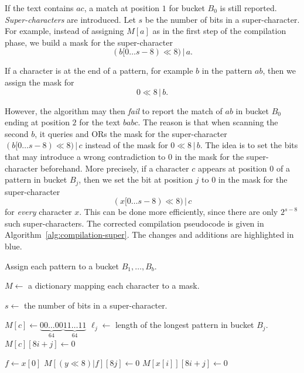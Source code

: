 If the text contains $ac$, a match at position $1$ for bucket $B_0$ is still reported. \textit{Super-characters} are introduced. Let $s$ be the number of bits in a super-character. For example, instead of assigning $M[a]$ as in the first step of the compilation phase, we build a mask for the super-character
$$(b[0\ldots s-8)\ll 8) \,|\, a.$$

If a character is at the end of a pattern, for example $b$ in the pattern $ab$, then we assign the mask for
$$0\ll 8 \,|\, b.$$

However, the algorithm may then \textit{fail} to report the match of $ab$ in bucket $B_0$ ending at position $2$ for the text $babc$. The reason is that when scanning the second $b$, it queries and ORs the mask for the super-character $(b[0\ldots s-8)\ll 8) \,|\, c$ instead of the mask for $0\ll 8 \,|\, b$. The idea is to set the bits that may introduce a wrong contradiction to $0$ in the mask for the super-character beforehand. More precisely, if a character $c$ appears at position $0$ of a pattern in bucket $B_j$, then we set the bit at position $j$ to $0$ in the mask for the super-character
$$(x[0\ldots s-8)\ll 8) \,|\, c$$
for \textit{every} character $x$. This can be done more efficiently, since there are only $2^{s-8}$ such super-characters. The corrected compilation pseudocode is given in Algorithm~\ref{alg:compilation-super}. The changes and additions are highlighted in \textcolor{gustave}{blue}.

\begin{algorithm}[H]
  \caption{Compilation phase: building masks with super-characters}
  \label{alg:compilation-super}
  \begin{algorithmic}[1]
    \State Assign each pattern to a bucket $B_1,\ldots,B_b$.

    \State $M\gets$  a dictionary mapping each character to a mask.

    \State \textcolor{gustave}{$s\gets$ the number of bits in a super-character.}

    \State $M[c] \gets \underbrace{00\ldots00}_{64}\underbrace{11\ldots11}_{64}$ 
    \State $\ell_j\gets$ length of the longest pattern in bucket $B_j$.
    \State $M[c][8i+j] \gets 0$ 
    \EndFor
    \EndFor
    \EndFor

    \State \textcolor{gustave}{$f\gets x[0]$} \Comment{\textcolor{gustave}{Handle the end character.}}
    \State \textcolor{gustave}{$M[(y\ll 8) | f][8j] \gets 0$}
    \EndFor
    \State $M[x[i]][8i+j] \gets 0$
    \EndFor
    \EndFor
    \EndFor
  \end{algorithmic}
\end{algorithm}

